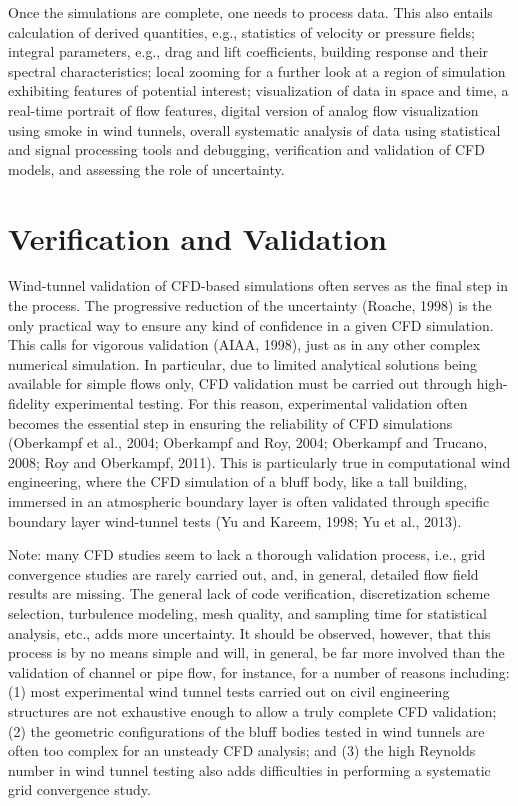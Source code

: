 Once the simulations are complete, one needs to process data. This also entails calculation of derived quantities, e.g., statistics of velocity or pressure fields; integral parameters, e.g., drag and lift coefficients, building response and their spectral characteristics; local zooming for a further look at a region of simulation exhibiting features of potential interest; visualization of data in space and time, a real-time portrait of flow features, digital version of analog flow visualization using smoke in wind tunnels, overall systematic analysis of data using statistical and signal processing tools and debugging, verification and validation of CFD models, and assessing the role of uncertainty.

\section{Verification and Validation}
\label{sec:resp_cfd_wind_flow_modeling}

Wind-tunnel validation of CFD-based simulations often serves as the final step in the process. The progressive reduction of the uncertainty (Roache, 1998) is the only practical way to ensure any kind of confidence in a given CFD simulation. This calls for vigorous validation (AIAA, 1998), just as in any other complex numerical simulation. In particular, due to limited analytical solutions being available for simple flows only, CFD validation must be carried out through high-fidelity experimental testing. For this reason, experimental validation often becomes the essential step in ensuring the reliability of CFD simulations (Oberkampf et al., 2004; Oberkampf and Roy, 2004; Oberkampf and Trucano, 2008; Roy and Oberkampf, 2011). This is particularly true in computational wind engineering, where the CFD simulation of a bluff body, like a tall building, immersed in an atmospheric boundary layer is often validated through specific boundary layer wind-tunnel tests (Yu and Kareem, 1998; Yu et al., 2013).

Note: many CFD studies seem to lack a thorough validation process, i.e., grid convergence studies are rarely carried out, and, in general, detailed flow field results are missing. The general lack of code verification, discretization scheme selection, turbulence modeling, mesh quality, and sampling time for statistical analysis, etc., adds more uncertainty. It should be observed, however, that this process is by no means simple and will, in general, be far more involved than the validation of channel or pipe flow, for instance, for a number of reasons including: (1) most experimental wind tunnel tests carried out on civil engineering structures are not exhaustive enough to allow a truly complete CFD validation; (2) the geometric configurations of the bluff bodies tested in wind tunnels are often too complex for an unsteady CFD analysis; and (3) the high Reynolds number in wind tunnel testing also adds difficulties in performing a systematic grid convergence study.

